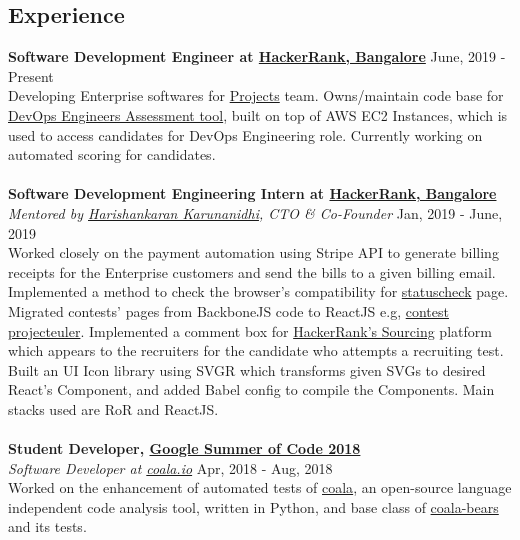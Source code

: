 \documentclass[margin, centered]{res}
\begin{document}
\begin{resume}
    \section{Experience}
    \textbf{Software Development Engineer at \href{https://www.hackerrank.com}{HackerRank, Bangalore}} \hfill June, 2019 - Present \\
    Developing Enterprise softwares for \href{https://www.hackerrank.com/products/projects}{Projects} team. Owns/maintain code base for \href{https://www.hackerrank.com/products/projects#role5}{DevOps Engineers Assessment tool},
    built on top of AWS EC2 Instances, which is used to access candidates for DevOps Engineering role. Currently working on automated scoring for candidates.\\
    \\
    \textbf{Software Development Engineering Intern at \href{https://www.hackerrank.com}{HackerRank, Bangalore}} \\
    \emph{Mentored by \href{https://www.hackerrank.com/about-us/our-team/}{Harishankaran Karunanidhi}\footnotesize{, CTO \& Co-Founder}} \hfill Jan, 2019 - June, 2019 \\
    Worked closely on the payment automation using Stripe API to generate billing receipts for
    the Enterprise customers and send the bills to a given billing email. Implemented a method to check the browser's compatibility
    for \href{https://www.hackerrank.com/statuscheck}{statuscheck} page. Migrated contests' pages from
    BackboneJS code to ReactJS e.g, \href{https://www.hackerrank.com/projecteuler/}{contest projecteuler}.
    Implemented a comment box for \href{https://www.hackerrank.com/work}{HackerRank's Sourcing} platform
    which appears to the recruiters for the candidate who attempts a recruiting test. Built an UI Icon library
    using SVGR which transforms given SVGs to desired React's Component, and added Babel config to compile
    the Components. Main stacks used are RoR and ReactJS. \\
    \\
    \textbf{Student Developer, \href{https://summerofcode.withgoogle.com/}{Google Summer of Code 2018}} \\
    \emph{Software Developer at \href{https://coala.io/}{coala.io}} \hfill Apr, 2018 - Aug, 2018 \\
    Worked on the enhancement of automated tests of \href{https://github.com/coala/coala}{coala},
    an open-source language independent code analysis tool, written in Python, and base
    class of \href{https://github.com/coala/coala-bears}{coala-bears} and its tests.

\end{resume}
\end{document}
